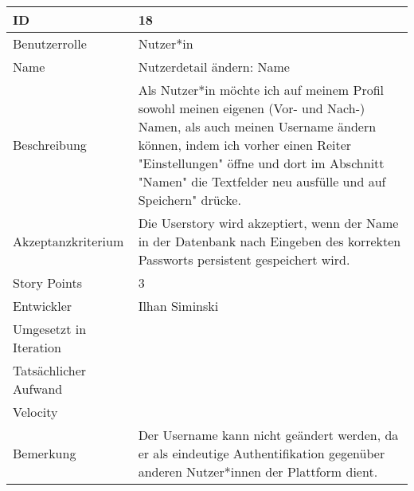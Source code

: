 \begin{tabularx}{\textwidth}{|p{}|X|}
	\hline
	ID & 18\\
	\hline
	Benutzerrolle & Nutzer*in\\
	\hline
	Name & Nutzerdetail ändern: Name\\
	\hline
	Beschreibung & Als Nutzer*in möchte ich auf meinem Profil sowohl meinen eigenen (Vor- und Nach-) Namen, als auch meinen Username ändern können, indem ich vorher einen Reiter "Einstellungen" öffne und dort im Abschnitt "Namen" die Textfelder neu ausfülle und auf Speichern" drücke.\\
	\hline
	Akzeptanzkriterium & Die Userstory wird akzeptiert, wenn der Name in der Datenbank nach Eingeben des korrekten Passworts persistent gespeichert wird.\\
	\hline
	Story Points & 3\\
	\hline
	Entwickler & Ilhan Siminski\\
	\hline
	Umgesetzt in Iteration & \\ 
	\hline
	Tatsächlicher Aufwand & \\
	\hline
	Velocity & \\
	\hline
	Bemerkung & Der Username kann nicht geändert werden, da er als eindeutige Authentifikation gegenüber anderen Nutzer*innen der Plattform dient.\\
	\hline
\end{tabularx}
\vspace{20pt}
